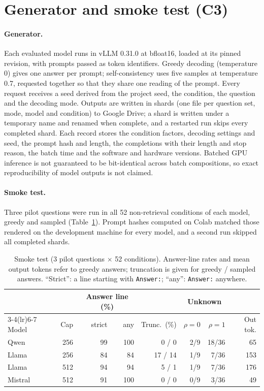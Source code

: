 \documentclass[11pt,a4paper]{report}
\begin{document}
\section{Generator and smoke test (C3)}\label{sec:c3}

\paragraph{Generator.}
Each evaluated model runs in vLLM 0.31.0 at bfloat16, loaded at its pinned
revision, with prompts passed as token identifiers. Greedy decoding
(temperature 0) gives one answer per prompt; self-consistency uses five samples
at temperature 0.7, requested together so that they share one reading of the
prompt. Every request receives a seed derived from the project seed, the
condition, the question and the decoding mode. Outputs are written in shards
(one file per question set, mode, model and condition) to Google Drive; a shard
is written under a temporary name and renamed when complete, and a restarted
run skips every completed shard. Each record stores the condition factors,
decoding settings and seed, the prompt hash and length, the completions with
their length and stop reason, the batch time and the software and hardware
versions. Batched GPU inference is not guaranteed to be bit-identical across
batch compositions, so exact reproducibility of model outputs is not claimed.

\paragraph{Smoke test.}
Three pilot questions were run in all 52 non-retrieval conditions of each
model, greedy and sampled (Table~\ref{tab:c3-smoke}). Prompt hashes computed on
Colab matched those rendered on the development machine for every model, and a
second run skipped all completed shards.

\begin{table}[h]
\centering\small
\begin{tabular}{@{}lrrrrrrr@{}}
\toprule
 & & \multicolumn{2}{c}{Answer line (\%)} & & \multicolumn{2}{c}{Unknown} & \\
\cmidrule(lr){3-4}\cmidrule(lr){6-7}
Model & Cap & strict & any & Trunc.\ (\%) & $\rho{=}0$ & $\rho{=}1$ & Out tok. \\
\midrule
Qwen    & 256 & 99 & 100 & 0 / 0  & 2/9 & 18/36 & 65 \\
Llama   & 256 & 84 & 84  & 17 / 14 & 1/9 & 7/36 & 153 \\
Llama   & 512 & 94 & 94  & 5 / 1  & 1/9 & 7/36 & 176 \\
Mistral & 512 & 91 & 100 & 0 / 0  & 0/9 & 3/36 & 49 \\
\bottomrule
\end{tabular}
\caption{Smoke test (3 pilot questions $\times$ 52 conditions). Answer-line
rates and mean output tokens refer to greedy answers; truncation is given for
greedy / sampled answers. ``Strict'': a line starting with \texttt{Answer:};
``any'': \texttt{Answer:} anywhere.}
\label{tab:c3-smoke}
\end{table}
\end{document}
